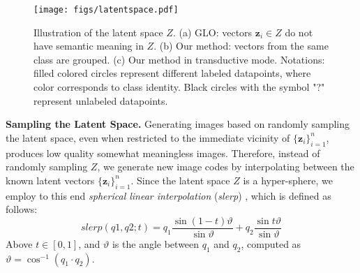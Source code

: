\documentclass[a4paper,conference]{IEEEtran}
\newcommand{\bz}{{\mathbf z}}
\begin{document}
\begin{figure}[htbp]
\begin{center}
		\centerline{\texttt{[image: figs/latentspace.pdf]}}
		\caption{Illustration of the latent space $Z$. (a) GLO: vectors $\bz_i\in Z$ do not have semantic meaning in $Z$. (b) Our method: vectors from the same class are grouped. (c) Our method in transductive mode. Notations: filled colored circles represent different labeled datapoints, where color corresponds to class identity. Black circles with the symbol "?" represent unlabeled datapoints.}
		\label{fig:embed}
	\end{center}
	\vskip -0.2in
\end{figure}

\textbf{Sampling the Latent Space.} 
Generating images based on randomly sampling the latent space, even when restricted to the immediate vicinity of $\{\bz_i\}_{i=1}^n$, produces low quality somewhat meaningless images. Therefore, instead of randomly sampling $Z$, we generate new image codes by interpolating between the known latent vectors $\{\bz_i\}_{i=1}^n$. Since the latent space $Z$ is a hyper-sphere, we employ to this end \textit{spherical linear interpolation} (\emph{slerp}) \cite{Shoemake:1985:ARQ:325165.325242}, which is defined as follows: 
\begin{equation}
	\label{eq:slerp}
	slerp(q1, q2;t) = q_1\frac{\sin{(1-t)\vartheta}}{\sin{\vartheta}}  + 
	q_2\frac{\sin{t\vartheta}}{\sin{\vartheta}}
\end{equation}
Above $t \in [0,1]$, and $\vartheta$ is the angle between $q_1$ and $q_2$, computed as $\vartheta = \cos^{-1} (q_1 \cdot q_2)$.
\end{document}
